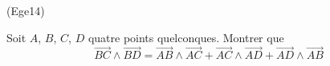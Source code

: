 \begin{tiny}(Ege14)\end{tiny} Soit $A$, $B$, $C$, $D$ quatre points quelconques. Montrer que
\begin{displaymath}
 \overrightarrow{BC}\wedge \overrightarrow{BD}=
\overrightarrow{AB}\wedge \overrightarrow{AC} +
\overrightarrow{AC}\wedge \overrightarrow{AD} +
\overrightarrow{AD}\wedge \overrightarrow{AB}  
\end{displaymath}
 
